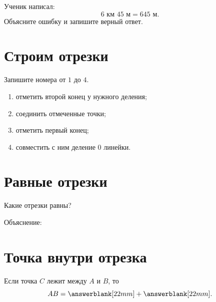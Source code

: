 \begin{warningbox}
  Ученик написал:
  \[
    6\text{ км }45\text{ м}=645\text{ м}.
  \]
  Объясните ошибку и запишите верный ответ.
\end{warningbox}

\section{Строим отрезки}

\begin{fillbox}
  Запишите номера от \(1\) до \(4\).
  \begin{enumerate}[label=\choicebox,itemsep=0.35em]
    \item отметить второй конец у нужного деления;
    \item соединить отмеченные точки;
    \item отметить первый конец;
    \item совместить с ним деление \(0\) линейки.
  \end{enumerate}
\end{fillbox}

\begin{practicebox}
  \studentconstructionfigure
\end{practicebox}

\section{Равные отрезки}

\equalcontrastingsegmentsfigure

\begin{practicebox}[Задание 6]
  Какие отрезки равны? \answerblank[48mm]

  Объяснение: \answerblank[95mm]
\end{practicebox}

\section{Точка внутри отрезка}

\partssegmentfigure

\begin{fillbox}
  Если точка \(C\) лежит между \(A\) и \(B\), то
  \[
    AB=\answerblank[22mm]+\answerblank[22mm].
  \]
\end{fillbox}

